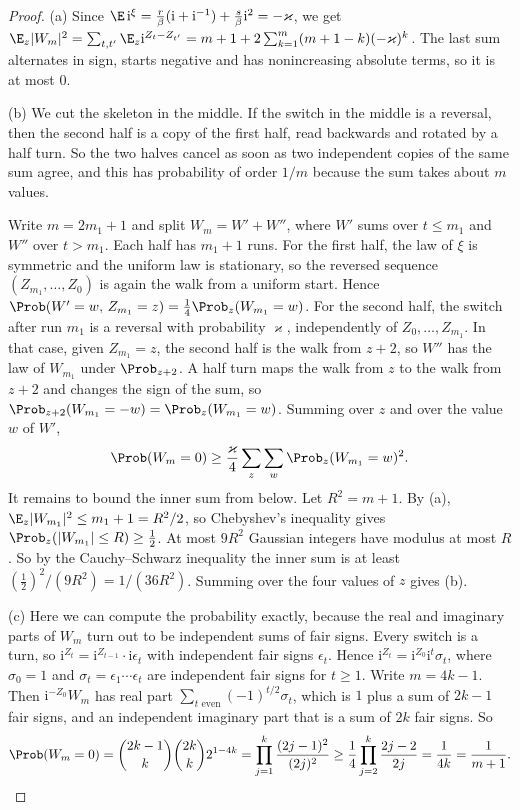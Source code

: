 \begin{proof}
(a) Since $\E\,\mathrm i^\xi=\frac r\beta(\mathrm i+\mathrm i^{-1})+\frac s\beta\mathrm i^2=-\varkappa$,
we get $\E_z\lvert W_m\rvert^2=\sum_{t,t'}\E_z\mathrm i^{Z_t-Z_{t'}}
=m+1+2\sum_{k=1}^m(m+1-k)(-\varkappa)^k$. The last sum alternates in sign, starts negative and
has nonincreasing absolute terms, so it is at most $0$.

(b) We cut the skeleton in the middle. If the switch in the middle is a reversal, then the second
half is a copy of the first half, read backwards and rotated by a half turn. So the two halves
cancel as soon as two independent copies of the same sum agree, and this has probability of order
$1/m$ because the sum takes about $m$ values.

Write $m=2m_1+1$ and split $W_m=W'+W''$, where $W'$ sums over $t\le m_1$ and $W''$ over $t>m_1$.
Each half has $m_1+1$ runs. For the first half, the law of $\xi$ is symmetric and the uniform law
is stationary, so the reversed sequence $(Z_{m_1},\dots,Z_0)$ is again the walk from a uniform
start. Hence $\Prob(W'=w,\,Z_{m_1}=z)=\frac14\Prob_z(W_{m_1}=w)$. For the second half, the switch
after run $m_1$ is a reversal with probability $\varkappa$, independently of $Z_0,\dots,Z_{m_1}$.
In that case, given $Z_{m_1}=z$, the second half is the walk from $z+2$, so $W''$ has the law of
$W_{m_1}$ under $\Prob_{z+2}$. A half turn maps the walk from $z$ to the walk from $z+2$ and
changes the sign of the sum, so $\Prob_{z+2}(W_{m_1}=-w)=\Prob_z(W_{m_1}=w)$. Summing over $z$ and
over the value $w$ of $W'$,
\[
 \Prob(W_m=0)\ge\frac\varkappa4\sum_z\sum_w\Prob_z(W_{m_1}=w)^2 .
\]
It remains to bound the inner sum from below. Let $R^2=m+1$. By (a),
$\E_z\lvert W_{m_1}\rvert^2\le m_1+1=R^2/2$, so Chebyshev's inequality gives
$\Prob_z(\lvert W_{m_1}\rvert\le R)\ge\frac12$. At most $9R^2$ Gaussian integers have modulus at
most $R$. So by the Cauchy--Schwarz inequality the inner sum is at least
$(\frac12)^2/(9R^2)=1/(36R^2)$. Summing over the four values of $z$ gives (b).

(c) Here we can compute the probability exactly, because the real and imaginary parts of $W_m$
turn out to be independent sums of fair signs. Every switch is a turn, so
$\mathrm i^{Z_t}=\mathrm i^{Z_{t-1}}\cdot\mathrm i\epsilon_t$ with
independent fair signs $\epsilon_t$. Hence $\mathrm i^{Z_t}=\mathrm i^{Z_0}\mathrm i^t\sigma_t$, where
$\sigma_0=1$ and $\sigma_t=\epsilon_1\cdots\epsilon_t$ are independent fair signs for $t\ge1$. Write
$m=4k-1$. Then $\mathrm i^{-Z_0}W_m$ has real part $\sum_{t\text{ even}}(-1)^{t/2}\sigma_t$, which is
$1$ plus a sum of $2k-1$ fair signs, and an independent imaginary part that is a sum of $2k$ fair
signs. So
\[
 \Prob(W_m=0)=\binom{2k-1}k\binom{2k}k2^{1-4k}=\prod_{j=1}^k\frac{(2j-1)^2}{(2j)^2}
 \ge\frac14\prod_{j=2}^k\frac{2j-2}{2j}=\frac1{4k}=\frac1{m+1}.
\]
\end{proof}


